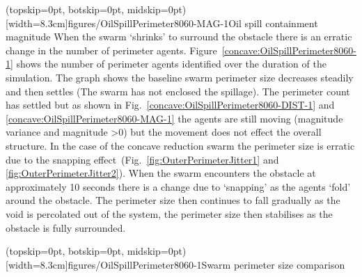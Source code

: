 \documentclass{ieeeaccess}
\begin{document}
\Figure[t!](topskip=0pt, botskip=0pt, midskip=0pt)[width=8.3cm]{figures/OilSpillPerimeter8060-MAG-1}{Oil spill containment magnitude\label{concave:OilSpillPerimeter8060-MAG-1}}
When the swarm `shrinks' to surround the obstacle there is an erratic change in the number of perimeter agents. Figure~\ref{concave:OilSpillPerimeter8060-1} shows the number of perimeter agents identified over the duration of the simulation. The graph shows the baseline swarm perimeter size decreases steadily and then settles (The swarm has not enclosed the spillage). The perimeter count has settled but as shown in Fig.~\ref{concave:OilSpillPerimeter8060-DIST-1} and \ref{concave:OilSpillPerimeter8060-MAG-1} the agents are still moving (magnitude variance and magnitude \textgreater 0) but the movement does not effect the overall structure. 
In the case of the concave reduction swarm the perimeter size is erratic due to the snapping effect~(Fig.~\ref{fig:OuterPerimeterJitter1} and \ref{fig:OuterPerimeterJitter2}). When the swarm encounters the obstacle at approximately 10 seconds there is a change due to `snapping' as the agents `fold' around the obstacle. The perimeter size then continues to fall gradually as the void is percolated out of the system, the perimeter size then stabilises as the obstacle is fully surrounded.

\Figure[t!](topskip=0pt, botskip=0pt, midskip=0pt)[width=8.3cm]{figures/OilSpillPerimeter8060-1}{Swarm perimeter size comparison\label{concave:OilSpillPerimeter8060-1}}
\end{document}
